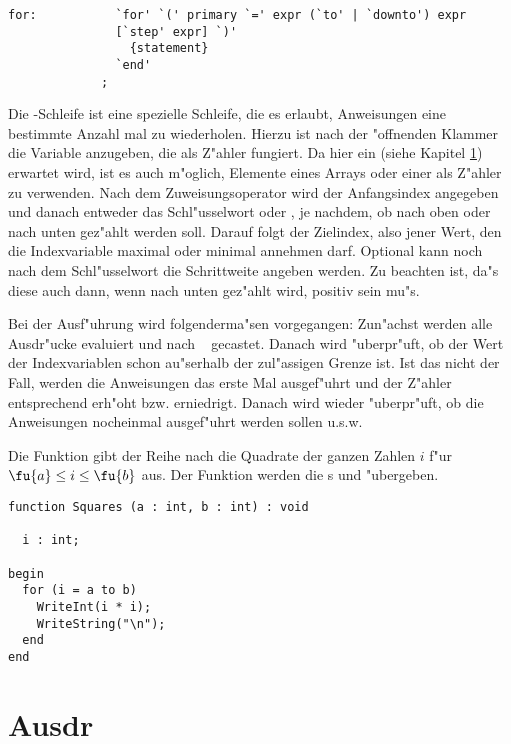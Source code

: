 \begin{verbatim}
for:           `for' `(' primary `=' expr (`to' | `downto') expr
               [`step' expr] `)'
                 {statement}
               `end'
             ;
\end{verbatim}

Die -Schleife ist eine spezielle Schleife, die es
erlaubt, Anweisungen eine bestimmte Anzahl mal zu wiederholen.
Hierzu ist nach der "offnenden Klammer die Variable anzugeben,
die als Z"ahler fungiert. Da hier ein  (siehe Kapitel
\ref{exprs}) erwartet wird,
ist es auch m"oglich, Elemente eines Arrays
oder einer 
als Z"ahler zu verwenden. Nach dem Zuweisungsoperator wird der
Anfangsindex angegeben und danach entweder das Schl"usselwort
 oder , je nachdem, ob nach oben oder nach
unten gez"ahlt werden soll. Darauf folgt der Zielindex, also
jener Wert, den die Indexvariable maximal oder minimal annehmen
darf. Optional kann noch nach dem Schl"usselwort  die
Schrittweite angeben werden. Zu beachten ist, da"s diese auch
dann, wenn nach unten gez"ahlt wird, positiv sein mu"s.

Bei der Ausf"uhrung wird folgenderma"sen vorgegangen: Zun"achst
werden alle Ausdr"ucke
evaluiert und nach \tint\
gecastet. Danach
wird "uberpr"uft, ob der Wert der Indexvariablen schon au"serhalb
der zul"assigen Grenze ist. Ist das nicht der Fall, werden die
Anweisungen das erste Mal ausgef"uhrt und der Z"ahler
entsprechend erh"oht bzw. erniedrigt. Danach wird wieder
"uberpr"uft, ob die Anweisungen nocheinmal ausgef"uhrt werden
sollen u.s.w.

\example
Die Funktion  gibt der Reihe nach die Quadrate
der ganzen Zahlen $i$ f"ur \hbox{$ \le i \le {}$} aus.
Der Funktion werden die \tint s \fu{a} und \fu{b} "ubergeben.

\begin{verbatim}
function Squares (a : int, b : int) : void

  i : int;

begin
  for (i = a to b)
    WriteInt(i * i);
    WriteString("\n");
  end
end
\end{verbatim}

\section{Ausdr}
\label{exprs}

